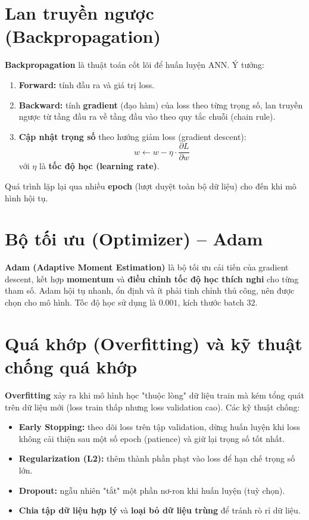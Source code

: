 \section{Lan truyền ngược (Backpropagation)}
\textbf{Backpropagation} là thuật toán cốt lõi để huấn luyện ANN. Ý tưởng:
\begin{enumerate}
  \item \textbf{Forward:} tính đầu ra và giá trị loss.
  \item \textbf{Backward:} tính \textbf{gradient} (đạo hàm) của loss theo từng
        trọng số, lan truyền ngược từ tầng đầu ra về tầng đầu vào theo quy tắc
        chuỗi (chain rule).
  \item \textbf{Cập nhật trọng số} theo hướng giảm loss (gradient descent):
        \begin{equation}
          w \leftarrow w - \eta \cdot \frac{\partial L}{\partial w}
        \end{equation}
        với $\eta$ là \textbf{tốc độ học (learning rate)}.
\end{enumerate}
Quá trình lặp lại qua nhiều \textbf{epoch} (lượt duyệt toàn bộ dữ liệu) cho đến
khi mô hình hội tụ.

\section{Bộ tối ưu (Optimizer) -- Adam}
\textbf{Adam (Adaptive Moment Estimation)} là bộ tối ưu cải tiến của gradient
descent, kết hợp \textbf{momentum} và \textbf{điều chỉnh tốc độ học thích nghi}
cho từng tham số. Adam hội tụ nhanh, ổn định và ít phải tinh chỉnh thủ công, nên
được chọn cho mô hình. Tốc độ học sử dụng là $0.001$, kích thước batch $32$.

\section{Quá khớp (Overfitting) và kỹ thuật chống quá khớp}
\textbf{Overfitting} xảy ra khi mô hình học "thuộc lòng" dữ liệu train mà kém
tổng quát trên dữ liệu mới (loss train thấp nhưng loss validation cao). Các kỹ
thuật chống:
\begin{itemize}
  \item \textbf{Early Stopping:} theo dõi loss trên tập validation, dừng huấn
        luyện khi loss không cải thiện sau một số epoch (patience) và giữ lại
        trọng số tốt nhất.
  \item \textbf{Regularization (L2):} thêm thành phần phạt vào loss để hạn chế
        trọng số lớn.
  \item \textbf{Dropout:} ngẫu nhiên "tắt" một phần nơ-ron khi huấn luyện
        (tuỳ chọn).
  \item \textbf{Chia tập dữ liệu hợp lý} và \textbf{loại bỏ dữ liệu trùng} để
        tránh rò rỉ dữ liệu.
\end{itemize}


